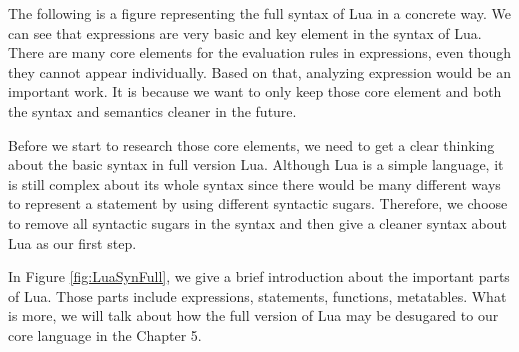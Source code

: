 The following is a figure representing the full syntax of Lua in a concrete way. We can see that expressions are very basic and key element in the syntax of Lua. There are many core elements for the evaluation rules in expressions, even though they cannot appear individually. Based on that, analyzing expression would be an important work. It is because we want to only keep those core element and both the syntax and semantics cleaner in the future.

Before we start to research those core elements, we need to get a clear thinking about the basic syntax in full version Lua. Although Lua is a simple language, it is still complex about its whole syntax since there would be many different ways to represent a statement by using different syntactic sugars. Therefore, we choose to remove all syntactic sugars in the syntax and then give a cleaner syntax about Lua as our first step.

In Figure \ref{fig:LuaSynFull}, we give a brief introduction about the important parts of Lua. Those parts include expressions, statements, functions, metatables. What is more, we will talk about how the full version of Lua may be desugared to our core language in the Chapter 5.


\newcommand{\syntax}[2]{{\tt #1}{\tt ~::=}{\tt ~~#2}\\}

\newcommand{\syntaxcase}[1]{{\tt \quad\quad\quad\quad\quad\quad~}{\tt ~~#1}\\}

